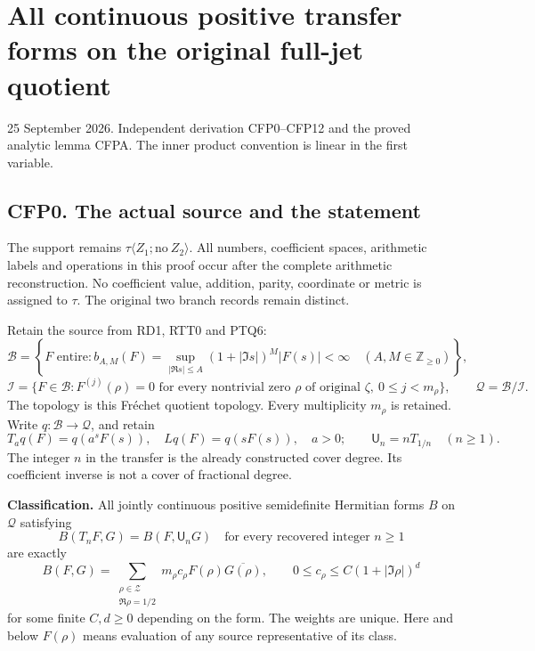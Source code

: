 \chapter{All continuous positive transfer forms on the original full-jet
quotient}\label{all-continuous-positive-transfer-forms-on-the-original-full-jet-quotient}

25 September 2026. Independent derivation CFP0--CFP12 and the proved
analytic lemma CFPA. The inner product convention is linear in the first
variable.

\section{CFP0. The actual source and the
statement}\label{cfp0.-the-actual-source-and-the-statement}

The support remains \(\tau\langle Z_1;\mathrm{no}\ Z_2\rangle\). All
numbers, coefficient spaces, arithmetic labels and operations in this
proof occur after the complete arithmetic reconstruction. No coefficient
value, addition, parity, coordinate or metric is assigned to \(\tau\).
The original two branch records remain distinct.

Retain the source from RD1, RTT0 and PTQ6: \[
\mathcal B=\left\{F\text{ entire}:b_{A,M}(F)=
\sup_{|\Re s|\le A}(1+|\Im s|)^M|F(s)|<\infty
\quad(A,M\in\mathbb Z_{\ge0})\right\},
\] \[
\mathcal I=\{F\in\mathcal B:F^{(j)}(\rho)=0
\text{ for every nontrivial zero }\rho\text{ of original }\zeta,
\ 0\le j<m_\rho\},\qquad
\mathcal Q=\mathcal B/\mathcal I.
\tag{CFP0.1}
\] The topology is this Fréchet quotient topology. Every multiplicity
\(m_\rho\) is retained. Write \(q:\mathcal B\to\mathcal Q\), and retain
\[
T_aq(F)=q(a^sF(s)),\quad Lq(F)=q(sF(s)),\quad a>0;
\qquad \mathsf U_n=nT_{1/n}\quad(n\ge1).
\tag{CFP0.2}
\] The integer \(n\) in the transfer is the already constructed cover
degree. Its coefficient inverse is not a cover of fractional degree.

\textbf{Classification.} All jointly continuous positive semidefinite
Hermitian forms \(B\) on \(\mathcal Q\) satisfying \[
B(T_nF,G)=B(F,\mathsf U_nG)
\quad\text{for every recovered integer }n\ge1
\tag{CFP0.3}
\] are exactly \[
\boxed{B(F,G)=\sum_{\substack{\rho\in\mathscr Z\\\Re\rho=1/2}}
m_\rho c_\rho F(\rho)\overline{G(\rho)},\qquad
0\le c_\rho\le C(1+|\Im\rho|)^d}
\tag{CFP0.4}
\] for some finite \(C,d\ge0\) depending on the form. The weights are
unique. Here and below \(F(\rho)\) means evaluation of any source
representative of its class.

